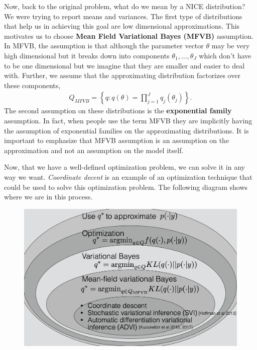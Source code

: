 \documentclass[10pt ]{article}
\begin{document}
Now, back to the original problem, what do we mean by a NICE distribution? We were trying to report means and variances. The first type of distributions that help us in achieving this goal are low dimensional approximations. This motivates us to choose \textbf{ Mean Field Variational Bayes (MFVB)}  assumption. In MFVB, the assumption is that although the parameter vector $\theta$ may be very high dimensional but it breaks down into components $\theta_1, \dots, \theta_J$ which don't have to be one dimensional but we imagine that they are smaller and easier to deal with. Further, we assume that the approximating distribution factorizes over these components,
\begin{align}
Q_{MFVB} = \left\{q \colon q(\theta) = \prod_{j=1}^J q_j(\theta_j) \right\}.
\label{eq_mvfb_def}
\end{align}
The second assumption on these distributions is the \textbf{exponential family} assumption. In fact, when people use the term MFVB they are implicitly having the assumption of exponential families on the approximating distributions. It is important to emphasize that MFVB assumption is an assumption on the approximation and not an assumption on the model itself. 

Now, that we have a well-defined optimization problem, we can solve it in any way we want. {\em Coordinate decent} is an example of an optimization technique that could be used to solve this optimization problem. The following diagram shows where we are in this process.
\begin{figure}[h]
\center
\includegraphics[scale=0.4]{subsets.png}
\end{figure}
\end{document}
